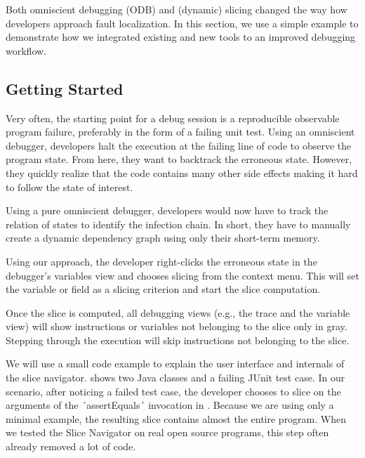 ﻿\documentclass[
      english,
			conference,
      ]{IEEEtran}
\newcommand{\todo}[2][]{\pdfmargincomment[color=orange,icon=Note,subject={TODO},author={#1}]{#2}}
\begin{document}
Both omniscient debugging (ODB) and (dynamic) slicing changed the way how developers approach fault localization.
In this section, we use a simple example to demonstrate how we integrated existing and new tools to an improved debugging workflow.

\todo{we describe ui, info and control}

\subsection{Getting Started}

Very often, the starting point for a debug session is a reproducible observable program failure, preferably in the form of a failing unit test.
Using an omniscient debugger, developers halt the execution at the failing line of code to observe the program state.
From here, they want to backtrack the erroneous state.
However, they quickly realize that the code contains many other side effects making it hard to follow the state of interest.

Using a pure omniscient debugger, developers would now have to track the relation of states to identify the infection chain. In short, they have to manually create a dynamic dependency graph using only their short-term memory.
 
Using our approach, the developer right-clicks the erroneous state in the debugger's variables view and chooses slicing from the context menu.
This will set the variable or field as a slicing criterion and start the slice computation.

Once the slice is computed, all debugging views (e.g., the trace and the variable view) will show instructions or variables not belonging to the slice only in gray.
Stepping through the execution will skip instructions not belonging to the slice.

We will use a small code example to explain the user interface and internals of the slice navigator. 
 shows two Java classes and a failing JUnit test case.
In our scenario, after noticing a failed test case, the developer chooses to slice on the arguments of the ´assertEquals´ invocation in .
Because we are using only a minimal example, the resulting slice contains almost the entire program.
When we tested the Slice Navigator on real open source programs, this step often already removed a lot of code.
\end{document}
